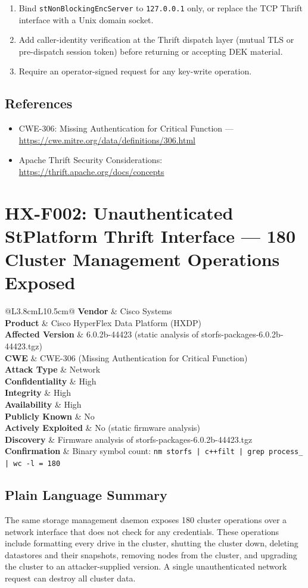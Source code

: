 \documentclass[11pt,a4paper]{article}
\makeatletter
\newcommand{\findingmeta}[9]{%
\begin{tabular}{@{}L{3.8cm}L{10.5cm}@{}}
\textbf{Vendor}             & Cisco Systems \\
\textbf{Product}            & Cisco HyperFlex Data Platform (HXDP) \\
\textbf{Affected Version}   & 6.0.2b-44423 (static analysis of storfs-packages-6.0.2b-44423.tgz) \\
\textbf{CWE}                & #1 \\
\textbf{Attack Type}        & #2 \\
\textbf{Confidentiality}    & #3 \\
\textbf{Integrity}          & #4 \\
\textbf{Availability}       & #5 \\
\textbf{Publicly Known}     & #6 \\
\textbf{Actively Exploited} & #7 \\
\textbf{Discovery}          & #8 \\
\textbf{Confirmation}       & #9 \\
\end{tabular}%
}
\makeatother
\begin{document}
\begin{enumerate}[noitemsep]
\item Bind \texttt{stNonBlockingEncServer} to \texttt{127.0.0.1} only, or
  replace the TCP Thrift interface with a Unix domain socket.
\item Add caller-identity verification at the Thrift dispatch layer (mutual TLS
  or pre-dispatch session token) before returning or accepting DEK material.
\item Require an operator-signed request for any key-write operation.
\end{enumerate}

\subsection*{References}

\begin{itemize}[noitemsep]
\item CWE-306: Missing Authentication for Critical Function ---
  \url{https://cwe.mitre.org/data/definitions/306.html}
\item Apache Thrift Security Considerations:
  \url{https://thrift.apache.org/docs/concepts}
\end{itemize}

\bigskip

\section{HX-F002: Unauthenticated StPlatform Thrift Interface --- 180 Cluster Management Operations Exposed}

\findingmeta{CWE-306 (Missing Authentication for Critical Function)}{Network}{High}{High}{High}{No}{No (static firmware analysis)}{Firmware analysis of storfs-packages-6.0.2b-44423.tgz}{Binary symbol count: \texttt{nm storfs | c++filt | grep process\_ | wc -l = 180}}

\subsection*{Plain Language Summary}

The same storage management daemon exposes 180 cluster operations over a
network interface that does not check for any credentials. These operations
include formatting every drive in the cluster, shutting the cluster down,
deleting datastores and their snapshots, removing nodes from the cluster, and
upgrading the cluster to an attacker-supplied version. A single unauthenticated
network request can destroy all cluster data.
\end{document}
